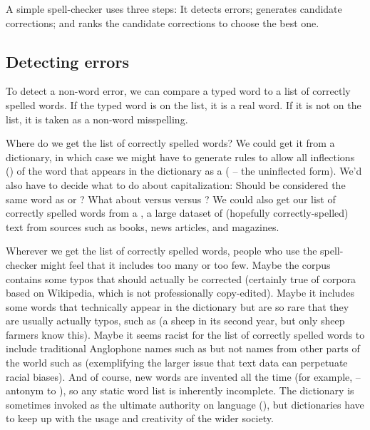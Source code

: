A simple spell-checker uses three steps: It detects errors; generates candidate corrections; and ranks the candidate corrections to choose the best one.  

\subsection{Detecting errors} \label{sec:detecting-errors}

To detect a non-word error, we can compare a typed word to a list of correctly spelled words.  If the typed word is on the list, it is a real word.  If it is not on the list, it is taken as a non-word misspelling.

Where do we get the list of correctly spelled words?  We could get it from a dictionary, in which case we might have to generate rules to allow all inflections () of the word that appears in the dictionary as a  ( -- the uninflected form).   We'd also have to decide what to do about capitalization: Should  be considered the same word as  or ?  What about  versus  versus ?  We could also get our list of correctly spelled words from a , a large dataset of (hopefully correctly-spelled) text from sources such as books, news articles, and magazines. 

Wherever we get the list of correctly spelled words, people who use the spell-checker might feel that it includes too many or too few.  Maybe the corpus contains some typos that should actually be corrected (certainly true of corpora based on Wikipedia, which is not professionally copy-edited).  Maybe it includes some words that technically appear in the dictionary but are so rare that they are usually actually typos, such as  (a sheep in its second year, but only sheep farmers know this).   Maybe it seems racist for the  list of correctly spelled words to include traditional Anglophone names such as  but not names from other parts of the world such as  (exemplifying the larger issue that text data can perpetuate racial biases). And of course, new words are invented all the time (for example,  -- antonym to ), so any static word list is inherently incomplete.  The dictionary is sometimes invoked as the ultimate authority on language (), but dictionaries have to keep up with the usage and creativity of the wider society.


